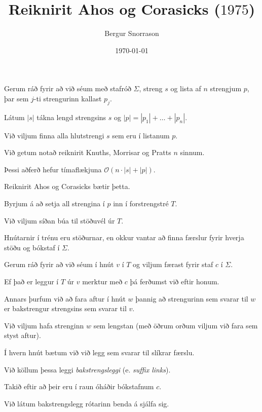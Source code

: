 \title{Reiknirit Ahos og Corasicks ($1975$)}
\author{Bergur Snorrason}
\date{\today}



\frame{\titlepage}

{
	{
		\item<1-> Gerum ráð fyrir að við séum með stafróð $\Sigma$, streng $s$ og lista af $n$ strengjum $p$, þar sem $j$-ti strengurinn kallast $p_j$.
		\item<2-> Látum $|s|$ tákna lengd strengsins $s$ og $|p| = |p_1| + \dots + |p_n|$.
		\item<3-> Við viljum finna alla hlutstrengi $s$ sem eru í listanum $p$.
		\item<4-> Við getum notað reiknirit Knuths, Morrisar og Pratts $n$ sinnum.
		\item<5-> Þessi aðferð hefur tímaflækjuna $\mathcal{O}(n \cdot |s| + |p|)$.
		\item<6-> Reiknirit Ahos og Corasicks bætir þetta.
	}
}

{
	{
		\item<1-> Byrjum á að setja all strengina í $p$ inn í forstrengstré $T$.
		\item<2-> Við viljum síðan búa til stöðuvél úr $T$.
		\item<3-> Hnútarnir í trénu eru stöðurnar, en okkur vantar að finna færslur fyrir hverja stöðu og bókstaf í $\Sigma$.
		\item<4-> Gerum ráð fyrir að við séum í hnút $v$ í $T$ og viljum færast fyrir staf $c$ í $\Sigma$.
		\item<5-> Ef það er leggur í $T$ úr $v$ merktur með $c$ þá ferðumst við eftir honum.
		\item<6-> Annars þurfum við að fara aftur í hnút $w$ þannig að strengurinn sem svarar til $w$ er bakstrengur strengsins sem svarar til $v$.
		\item<7-> Við viljum hafa strenginn $w$ sem lengstan (með öðrum orðum viljum við fara sem styst aftur).
		\item<8-> Í hvern hnút bætum við við legg sem svarar til slíkrar færslu.
		\item<9-> Við köllum þessa leggi \emph{bakstrengsleggi} (e. \emph{suffix links}).
		\item<10-> Takið eftir að þeir eru í raun óháðir bókstafnum $c$.
		\item<11-> Við látum bakstrengslegg rótarinn benda á sjálfa sig.
	}
}

